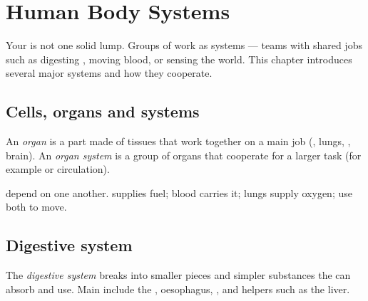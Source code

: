 \chapter{Human Body Systems}\label{ch:g4:body-systems}

Your  is not one solid lump. Groups of  work as systems ---
teams with shared jobs such as digesting , moving blood, or sensing
the world. This chapter introduces several major systems and how they
cooperate.

\section{Cells, organs and systems}

\begin{definition}\label{def:g4:body-systems:organs}
An \emph{organ} is a  part made of tissues that work
together on a main job (, lungs, , brain). An
\emph{organ system} is a group of organs that
cooperate for a larger task (for example  or circulation).
\end{definition}

\begin{proposition}[Teamwork]\label{prop:g4:body-systems:team}
 depend on one another.  supplies fuel; blood
carries it; lungs supply oxygen;  use both to move.
\end{proposition}
\admitted

\section{Digestive system}

\begin{definition}[Digestion]\label{def:g4:body-systems:digestion}
The \emph{digestive system} breaks  into
smaller pieces and simpler substances the  can absorb and use. Main
 include the , oesophagus, ,  and helpers
such as the liver.
\end{definition}

